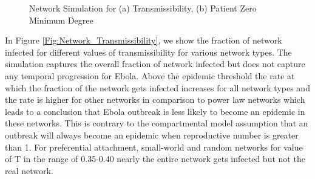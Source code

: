 \documentclass[10pt, journal,onecolumn]{IEEEtran}
\begin{document}
\begin{figure}[ht]
\centering
{}
\quad
{}
\caption{Network Simulation for (a) Transmissibility, (b) Patient Zero Minimum Degree}
\end{figure}

In Figure  \ref{Fig:Network_Transmissibility}, we show the fraction of network infected for
different values of transmissibility for  various network types.  The simulation captures the
overall fraction of network infected  but does not capture any temporal progression for Ebola. Above
the epidemic threshold the rate at which the  fraction of the network gets infected increases for
all network types and the rate is higher for other networks in comparison to power law networks
which leads to a conclusion that Ebola outbreak is less likely to become an epidemic in these
networks. This is contrary to the compartmental model assumption that an outbreak will always
become an epidemic when reproductive number is greater than 1. For preferential attachment,
small-world and random networks for value of T in the range of 0.35-0.40 nearly the entire network
gets infected but not the real network.
\end{document}
